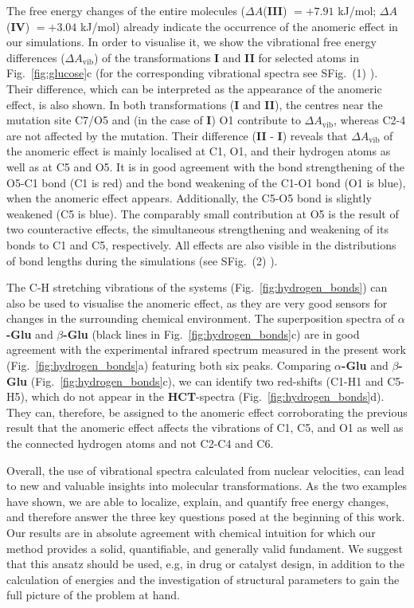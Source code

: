 \documentclass[journal=jpclcd,manuscript=article]{achemso}
\newcommand{\aglu}{\textbf{$\alpha$-Glu}}
\newcommand{\bglu}{\textbf{$\beta$-Glu}}
\newcommand{\agluahct}{\textbf{I}}
\newcommand{\bglubhct}{\textbf{II}}
\newcommand{\aglubglu}{\textbf{III}}
\newcommand{\ahctbhct}{\textbf{IV}}
\newcommand{\avib}{A_\mathrm{vib}}
\begin{document}
The free energy changes of the entire molecules ($\Delta A$(\aglubglu{}) $ = + 7.91$ kJ/mol; $\Delta A$(\ahctbhct{}) $ = + 3.04$ kJ/mol) already indicate the occurrence of the anomeric effect in our simulations. In order to visualise it, we show the vibrational free energy differences ($\Delta \avib{}$) of the transformations \agluahct{} and \bglubhct{} for selected atoms in Fig.~\ref{fig:glucose}c (for the corresponding vibrational spectra see SFig.~(1) ). Their difference, which can be interpreted as the appearance of the anomeric effect, is also shown. In both transformations (\agluahct{} and \bglubhct{}), the centres near the mutation site C7/O5 and (in the case of \agluahct{}) O1 contribute to $\Delta \avib{}$, whereas C2-4 are not affected by the mutation. Their difference (\bglubhct{} - \agluahct{}) reveals that $\Delta \avib{}$ of the anomeric effect is mainly localised at C1, O1, and their hydrogen atoms as well as at C5 and O5. It is in good agreement with the bond strengthening of the O5-C1 bond (C1 is red) and the bond weakening of the C1-O1 bond (O1 is blue), when the anomeric effect appears. Additionally, the C5-O5 bond is slightly weakened (C5 is blue). The comparably small contribution at O5 is the result of two counteractive effects, the simultaneous strengthening and weakening of its bonds to C1 and C5, respectively. All effects are also visible in the distributions of bond lengths during the simulations (see SFig.~(2) ). 



The C-H stretching vibrations of the systems (Fig.~\ref{fig:hydrogen_bonds}) can also be used to visualise the anomeric effect, as they are very good sensors for changes in the surrounding chemical environment. The superposition spectra of \aglu{} and \bglu{} (black lines in Fig.~\ref{fig:hydrogen_bonds}c) are in good agreement with the experimental infrared spectrum measured in the present work (Fig.~\ref{fig:hydrogen_bonds}a) featuring both six peaks. Comparing \aglu{} and \bglu{} (Fig.~\ref{fig:hydrogen_bonds}c), we can identify two red-shifts (C1-H1 and C5-H5), which do not appear in the \textbf{HCT}-spectra (Fig.~\ref{fig:hydrogen_bonds}d). They can, therefore, be assigned to the anomeric effect corroborating the previous result that the anomeric effect affects the vibrations of C1, C5, and O1 as well as the connected hydrogen atoms and not C2-C4 and C6.


Overall, the use of vibrational spectra calculated from nuclear velocities, can lead to new and valuable insights into molecular transformations. As the two examples have shown, we are able to localize, explain, and quantify free energy changes, and therefore answer the three key questions posed at the beginning of this work. Our results are in absolute agreement with chemical intuition for which our method provides a solid, quantifiable, and generally valid fundament. We suggest that this ansatz should be used, e.g, in drug or catalyst design, in addition to the calculation of energies and the investigation of structural parameters to gain the full picture of the problem at hand. 
\end{document}
